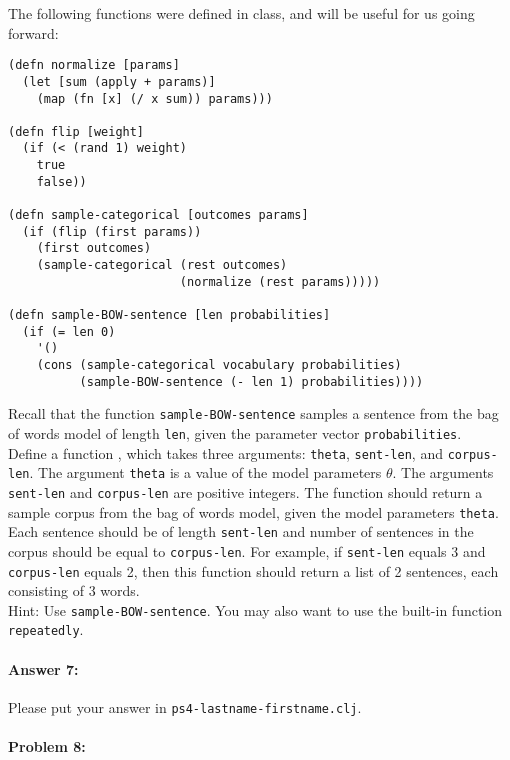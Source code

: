 \documentclass[10pt]{article}
\newcommand{\required}[1]{{\color{blue}{#1}}}
\newcommand{\PSnum}{4}
\begin{document}
\noindent The following functions were defined in class, and will be
useful for us going forward:

\begin{lstlisting}
(defn normalize [params]
  (let [sum (apply + params)]
    (map (fn [x] (/ x sum)) params)))

(defn flip [weight]
  (if (< (rand 1) weight)
    true
    false))

(defn sample-categorical [outcomes params]
  (if (flip (first params))
    (first outcomes)
    (sample-categorical (rest outcomes) 
                        (normalize (rest params)))))

(defn sample-BOW-sentence [len probabilities]
  (if (= len 0)
    '()
    (cons (sample-categorical vocabulary probabilities)
          (sample-BOW-sentence (- len 1) probabilities))))
\end{lstlisting}

\noindent Recall that the function \texttt{sample-BOW-sentence}
samples a sentence from the bag of words model of length \texttt{len},
given the parameter vector \texttt{probabilities}.  \\

\noindent Define a function \required{\texttt{sample-BOW-corpus}},
which takes three arguments: \texttt{theta}, \texttt{sent-len}, and
\texttt{corpus-len}. The argument \texttt{theta} is a value of the
model parameters $\theta$. The arguments \texttt{sent-len} and
\texttt{corpus-len} are positive integers. The function should return
a sample corpus from the bag of words model, given the model
parameters \texttt{theta}. Each sentence should be of length
\texttt{sent-len} and number of sentences in the corpus should be
equal to \texttt{corpus-len}. For example, if \texttt{sent-len} equals
3 and \texttt{corpus-len} equals 2, then this function should return a
list of 2 sentences, each consisting of 3 words.  \\

\noindent Hint: Use \texttt{sample-BOW-sentence}. You may also want to
use the built-in function \texttt{repeatedly}.

\paragraph{Answer 7:} Please put your answer in
\texttt{ps\PSnum-lastname-firstname.clj}.

\noindent\hrulefill %

\paragraph{Problem 8:}
\end{document}
